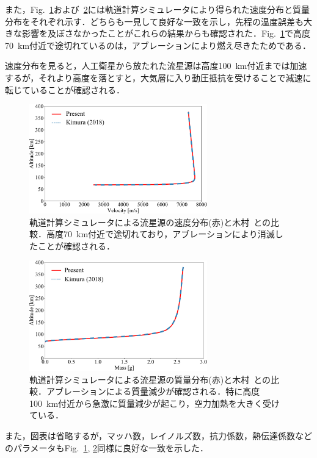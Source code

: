 \documentclass[a4paper,10pt]{jsarticle}
\begin{document}
\begin{multicols}{2}
また，Fig.~\ref{fig:vs-kimura-velo}および~\ref{fig:vs-kimura-mass}には軌道計算シミュレータにより得られた速度分布と質量分布をそれぞれ示す．どちらも一見して良好な一致を示し，先程の温度誤差も大きな影響を及ぼさなかったことがこれらの結果からも確認された．Fig.~\ref{fig:vs-kimura-velo}で高度70~km付近で途切れているのは，アブレーションにより燃え尽きたためである．

速度分布を見ると，人工衛星から放たれた流星源は高度100~km付近までは加速するが，それより高度を落とすと，大気層に入り動圧抵抗を受けることで減速に転じていることが確認される．

\begin{figure}[H]
  \centering
  \includegraphics[width=7.7cm]{fig/vs_Kimura/velo}
  \caption{軌道計算シミュレータによる流星源の速度分布(赤)と木村~\cite{kimura2018master}との比較．高度70~km付近で途切れており，アブレーションにより消滅したことが確認される．}
  \label{fig:vs-kimura-velo}
\end{figure}
\begin{figure}[H]
  \centering
  \includegraphics[width=7.7cm]{fig/vs_Kimura/mass}
  \caption{軌道計算シミュレータによる流星源の質量分布(赤)と木村~\cite{kimura2018master}との比較．アブレーションによる質量減少が確認される．特に高度100~km付近から急激に質量減少が起こり，空力加熱を大きく受けている．}
  \label{fig:vs-kimura-mass}
\end{figure}

また，図表は省略するが，マッハ数，レイノルズ数，抗力係数，熱伝達係数などのパラメータもFig.~\ref{fig:vs-kimura-velo}, \ref{fig:vs-kimura-mass}同様に良好な一致を示した．


\end{multicols}
\end{document}
